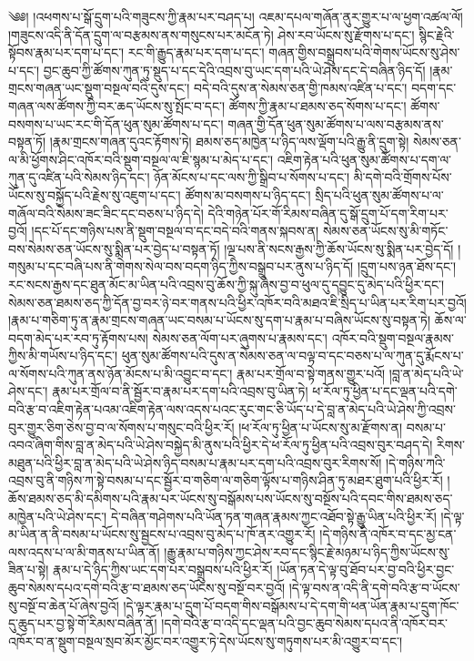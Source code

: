 ༄༅།  །འཕགས་པ་སྒོ་དྲུག་པའི་གཟུངས་ཀྱི་རྣམ་པར་བཤད་པ། འཇམ་དཔལ་གཞོན་ནུར་གྱུར་པ་ལ་ཕྱག་འཚལ་ལོ། །གཟུངས་འདི་ནི་དོན་དྲུག་ལ་བརྩམས་ནས་གསུངས་པར་མངོན་ཏེ། ཤེས་རབ་ཡོངས་སུ་རྫོགས་པ་དང་། སྙིང་རྗེའི་སྟོབས་རྣམ་པར་དག་པ་དང་། རང་གི་རྒྱུད་རྣམ་པར་དག་པ་དང་། གཞན་གྱིས་བསྒྲུབས་པའི་གེགས་ཡོངས་སུ་ཤེས་པ་དང་། བྱང་ཆུབ་ཀྱི་ཚོགས་ཀུན་ཏུ་སྡུད་པ་དང་དེའི་འབྲས་བུ་ཡང་དག་པའི་ཡེ་ཤེས་དང་དེ་བཞིན་ཉིད་དོ། །རྣམ་གྲངས་གཞན་ཡང་སྡུག་བསྔལ་བའི་དུས་དང་། བདེ་བའི་དུས་ན་སེམས་ཅན་གྱི་ཁམས་འཛིན་པ་དང་། བདག་དང་གཞན་ལས་ཚོགས་ཀྱི་བར་ཆད་ཡོངས་སུ་སྤོང་བ་དང་། ཚོགས་ཀྱི་རྣམ་པ་ཐམས་ཅད་སོགས་པ་དང་། ཚོགས་བསགས་པ་ཡང་རང་གི་དོན་ཕུན་སུམ་ཚོགས་པ་དང་། གཞན་གྱི་དོན་ཕུན་སུམ་ཚོགས་པ་ལས་བརྩམས་ནས་བསྟན་ཏོ། །རྣམ་གྲངས་གཞན་དུའང་རྟོགས་ཏེ། ཐམས་ཅད་མཁྱེན་པ་ཉིད་ལས་ལྡོག་པའི་རྒྱུ་ནི་དྲུག་སྟེ། སེམས་ཅན་ལ་མི་ཕྱོགས་ཤིང་འཁོར་བའི་སྡུག་བསྔལ་ལ་ཇི་སྙམ་པ་མེད་པ་དང་། འཇིག་རྟེན་པའི་ཕུན་སུམ་ཚོགས་པ་དག་ལ་ཀུན་དུ་འཛིན་པའི་སེམས་ཉིད་དང་། ཉོན་མོངས་པ་དང་ལས་ཀྱི་སྒྲིབ་པ་སོགས་པ་དང་། མི་དགེ་བའི་གྲོགས་པོས་ཡོངས་སུ་བསྐྱོད་པའི་རྗེས་སུ་འཇུག་པ་དང་། ཚོགས་མ་བསགས་པ་ཉིད་དང་། སྲིད་པའི་ཕུན་སུམ་ཚོགས་པ་ལ་གཞོལ་བའི་སེམས་ཟང་ཟིང་དང་བཅས་པ་ཉིད་དེ། དེའི་གཉེན་པོར་གོ་རིམས་བཞིན་དུ་སྒོ་དྲུག་པོ་དག་རིག་པར་བྱའོ། །དང་པོ་དང་གཉིས་པས་ནི་སྡུག་བསྔལ་བ་དང་བདེ་བའི་གནས་སྐབས་ན། སེམས་ཅན་ཡོངས་སུ་མི་གཏོང་བས་སེམས་ཅན་ཡོངས་སུ་སྨིན་པར་བྱེད་པ་བསྟན་ཏོ། །ལྔ་པས་ནི་སངས་རྒྱས་ཀྱི་ཆོས་ཡོངས་སུ་སྨིན་པར་བྱེད་དོ། །གསུམ་པ་དང་བཞི་པས་ནི་གེགས་སེལ་བས་བདག་ཉིད་ཀྱིས་བསྒྲུབ་པར་ནུས་པ་ཉིད་དོ། །དྲུག་པས་ཉན་ཐོས་དང་། རང་སངས་རྒྱས་དང་ཐུན་མོང་མ་ཡིན་པའི་འབྲས་བུ་ཆོས་ཀྱི་སྐུ་ཞེས་བྱ་བ་ཕུལ་དུ་དབྱུང་དུ་མེད་པའི་ཕྱིར་དང་། སེམས་ཅན་ཐམས་ཅད་ཀྱི་དོན་བྱ་བར་ཉེ་བར་གནས་པའི་ཕྱིར་འཁོར་བའི་མཐའ་ཇི་སྲིད་པ་ཡིན་པར་རིག་པར་བྱའོ། །རྣམ་པ་གཅིག་ཏུ་ན་རྣམ་གྲངས་གཞན་ཡང་བསམ་པ་ཡོངས་སུ་དག་པ་རྣམ་པ་བཞིས་ཡོངས་སུ་བསྟན་ཏེ། ཆོས་ལ་བདག་མེད་པར་རབ་ཏུ་རྟོགས་པས། སེམས་ཅན་ལོག་པར་ཞུགས་པ་རྣམས་དང་། འཁོར་བའི་སྡུག་བསྔལ་རྣམས་ཀྱིས་མི་གཡོས་པ་ཉིད་དང་། ཕུན་སུམ་ཚོགས་པའི་དུས་ན་སེམས་ཅན་ལ་བལྟ་བ་དང་བཅས་པ་ལ་ཀུན་དུ་རྨོངས་པ་ལ་སོགས་པའི་ཀུན་ནས་ཉོན་མོངས་པ་མི་འབྱུང་བ་དང་། རྣམ་པར་གྲོལ་བ་སྟེ་གནས་གྱུར་པའོ། །བླ་ན་མེད་པའི་ཡེ་ཤེས་དང་། རྣམ་པར་གྲོལ་བ་ནི་སྦྱོར་བ་རྣམ་པར་དག་པའི་འབྲས་བུ་ཡིན་ཏེ། ཕ་རོལ་ཏུ་ཕྱིན་པ་དང་ལྡན་པའི་དགེ་བའི་རྩ་བ་འཇིག་རྟེན་པའམ་འཇིག་རྟེན་ལས་འདས་པའང་རུང་གང་ཅི་ཡོད་པ་དེ་བླ་ན་མེད་པའི་ཡེ་ཤེས་ཀྱི་འབྲས་བུར་གྱུར་ཅིག་ཅེས་བྱ་བ་ལ་སོགས་པ་གསུང་བའི་ཕྱིར་རོ། །ཕ་རོལ་ཏུ་ཕྱིན་པ་ཡོངས་སུ་མ་རྫོགས་ན། བསམ་པ་འབའ་ཞིག་གིས་བླ་ན་མེད་པའི་ཡེ་ཤེས་བསྐྱེད་མི་ནུས་པའི་ཕྱིར་དེ་ཕ་རོལ་ཏུ་ཕྱིན་པའི་འབྲས་བུར་བཤད་དེ། རིགས་མཐུན་པའི་ཕྱིར་བླ་ན་མེད་པའི་ཡེ་ཤེས་ཉིད་བསམ་པ་རྣམ་པར་དག་པའི་འབྲས་བུར་རིགས་སོ། །དེ་གཉིས་ཀའི་འབྲས་བུ་ནི་གཉིས་ཀ་སྟེ་བསམ་པ་དང་སྦྱོར་བ་གཅིག་ལ་གཅིག་ལྟོས་པ་གཉིས་ཤིན་ཏུ་མཐར་ཐུག་པའི་ཕྱིར་རོ། །ཆོས་ཐམས་ཅད་མི་དམིགས་པའི་རྣམ་པར་ཡོངས་སུ་བསྒོམས་པས་ཡོངས་སུ་བསྔོས་པའི་དབང་གིས་ཐམས་ཅད་མཁྱེན་པའི་ཡེ་ཤེས་དང་། དེ་བཞིན་གཤེགས་པའི་ཡོན་ཏན་གཞན་རྣམས་ཀྱང་འཐོབ་སྟེ་རྒྱུ་ཡིན་པའི་ཕྱིར་རོ། །དེ་ལྟ་མ་ཡིན་ན་ནི་བསམ་པ་ཡོངས་སུ་སྦྱངས་པ་འབྲས་བུ་མེད་པ་ཁོ་ནར་འགྱུར་རོ། །དེ་གཉིས་ནི་འཁོར་བ་དང་མྱ་ངན་ལས་འདས་པ་ལ་མི་གནས་པ་ཡིན་ནོ། །རྒྱུ་རྣམ་པ་གཉིས་ཀྱང་ཤེས་རབ་དང་སྙིང་རྗེ་མཉམ་པ་ཉིད་ཀྱིས་ཡོངས་སུ་ཟིན་པ་སྟེ། རྣམ་པ་དེ་ཉིད་ཀྱིས་ཡང་དག་པར་བསྒྲུབས་པའི་ཕྱིར་རོ། །ཡོན་ཏན་དེ་ལྟ་བུ་ཐོབ་པར་བྱ་བའི་ཕྱིར་བྱང་ཆུབ་སེམས་དཔའ་དགེ་བའི་རྩ་བ་ཐམས་ཅད་ཡོངས་སུ་བསྔོ་བར་བྱའོ། །དེ་ལྟ་བས་ན་འདི་ནི་དགེ་བའི་རྩ་བ་ཡོངས་སུ་བསྔོ་བ་ཆེན་པོ་ཞེས་བྱའོ། །དེ་ལྟར་རྣམ་པ་དྲུག་པོ་བདག་གིས་བསྒོམས་པ་དེ་དག་གི་ཕན་ཡོན་རྣམ་པ་དྲུག་ཁོང་དུ་ཆུད་པར་བྱ་སྟེ་གོ་རིམས་བཞིན་ནོ། །དགེ་བའི་རྩ་བ་འདི་དང་ལྡན་པའི་བྱང་ཆུབ་སེམས་དཔའ་ནི་འཁོར་བར་འཁོར་བ་ན་སྡུག་བསྔལ་སྲབ་མོར་མྱོང་བར་འགྱུར་ཏེ་དེས་ཡོངས་སུ་གཏུགས་པར་མི་འགྱུར་བ་དང་། 